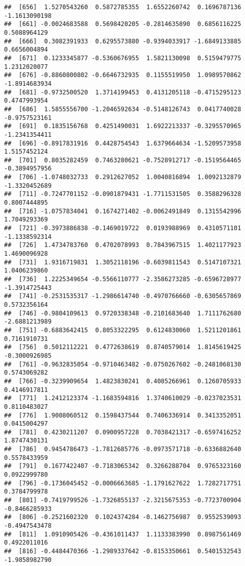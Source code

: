 \documentclass[
  12pt,
]{article}
\begin{document}
\begin{verbatim}
##  [656]  1.5270543260  0.5872785355  1.6552260742  0.1696787136 -1.1613090198
##  [661] -0.0024683588  0.5698420205 -0.2814635890  0.6856116225  0.5088964129
##  [666]  0.3082391933  0.6295573880 -0.9394033917 -1.6849133885  0.6656004894
##  [671]  0.1233345877 -0.5360676955  1.5821130098  0.5159479775  1.2312020077
##  [676] -0.8860800802 -0.6646732935  0.1155519950  1.0989570862 -1.8914683934
##  [681] -0.9732500520  1.3714199453  0.4131205118 -0.4715295123  0.4747993954
##  [686]  1.5855556700 -1.2046592634 -0.5148126743  0.0417740028 -0.9757523161
##  [691]  0.1835156768  0.4251490031  1.6922213337 -0.3295570965 -1.2341354411
##  [696] -0.8917831916  0.4428754543  1.6379664634 -1.5209573958  1.5157452124
##  [701]  0.8035282459  0.7463280621 -0.7528912717 -0.1519564465 -0.3894957956
##  [706] -1.0748032733  0.2912627052  1.0040816894  1.0092132879 -1.3320452689
##  [711] -0.7247701152 -0.0901879431 -1.7711531505  0.3588296328  0.8007444895
##  [716] -1.0757834041  0.1674271402 -0.0062491849  0.1315542996  1.7049293369
##  [721] -0.3973886838 -0.1469019722  0.0193988969  0.4310571101 -1.1338592314
##  [726]  1.4734783760  0.4702078993  0.7843967515  1.4021177923  1.4690096928
##  [731]  1.9316719831  1.3052118196 -0.6039811543  0.5147107321  1.0406239860
##  [736]  1.2225349654 -0.5566110777 -2.3586273285 -0.6596728977 -1.3914725443
##  [741] -0.2531535317 -1.2986614740 -0.4970766660 -0.6305657869  0.5732356164
##  [746] -0.9804109613  0.9720338348 -0.2101683640  1.7111762680 -2.6881213989
##  [751] -0.6883642415  0.8053322295  0.6124830060  1.5211201861  0.7161910731
##  [756]  0.5012112221  0.4772638619  0.8740579014  1.8145619425 -0.3000926985
##  [761] -0.9632835054 -0.9710463482 -0.0750267602 -0.2481068130  0.5743069282
##  [766] -0.3239909654  1.4823830241  0.4085266961  0.1260705933  0.4146917811
##  [771]  1.2412123374 -1.1683594816  1.3740610029 -0.0237023531  0.8110483027
##  [776]  1.9008060512  0.1598437544  0.7406336914  0.3413352051  0.0415004297
##  [781]  0.4230211207  0.0900957228  0.7038421317 -0.6597416252  1.8747430131
##  [786]  0.9454786473 -1.7812685776 -0.0973571718 -0.6336882640  0.5578433959
##  [791]  0.1677422407 -0.7183065342  0.3266288704  0.9765323160  0.0922999780
##  [796] -0.1736045452 -0.0006663685 -1.1791627622  1.7282717751  0.3784799978
##  [801] -0.7419799526 -1.7326855137 -2.3215675353 -0.7723700904 -0.8466285933
##  [806] -0.2521602320  0.1024374284 -0.1462756987  0.9552539093 -0.4947543478
##  [811]  1.0910905426 -0.4361011437  1.1133383990  0.8987561469  0.4922011016
##  [816] -0.4484470366 -1.2989337642 -0.8153350661  0.5401532543 -1.9858982790

\end{verbatim}
\end{document}
